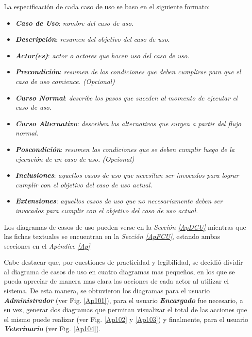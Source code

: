 \documentclass[11pt,oneside]{book}
\begin{document}
La especificación de cada caso de uso se baso en el siguiente formato:
\begin{itemize}
\item \textit{\textbf{Caso de Uso}}: \textit{nombre del caso de uso.}

\item \textit{\textbf{Descripción}}: \textit{resumen del objetivo del caso de uso.}

\item \textit{\textbf{Actor(es)}}: \textit{actor o actores que hacen uso del caso de uso.}

\item \textit{\textbf{Precondición}}: \textit{resumen de las condiciones que deben cumplirse para que el caso de uso comience. (Opcional)}

\item \textit{\textbf{Curso Normal}}: \textit{describe los pasos que suceden al momento de ejecutar el caso de uso.}

\item \textit{\textbf{Curso Alternativo}}: \textit{describen las alternativas que surgen a partir del flujo normal.}

\item \textit{\textbf{Poscondición}}: \textit{resumen las condiciones que se deben cumplir luego de la ejecución de un caso de uso. (Opcional)}

\item \textit{\textbf{Inclusiones}}: \textit{aquellos casos de uso que necesitan ser invocados para lograr cumplir con el objetivo del caso de uso actual.}

\item \textit{\textbf{Extensiones}}: \textit{aquellos casos de uso que no necesariamente deben ser invocados para cumplir con el objetivo del caso de uso actual.}
\end{itemize}

Los diagramas de casos de uso pueden verse en la \textit{Sección \eqref{ApDCU}} mientras que las fichas textuales se encuentran en la \textit{Sección \eqref{ApFCU}}, estando ambas secciones en el \textit{Apéndice \eqref{Ap}} 

Cabe destacar que, por cuestiones de practicidad y legibilidad, se decidió dividir al diagrama de casos de uso en cuatro diagramas mas pequeños, en los que se pueda apreciar de manera mas clara las acciones de cada actor al utilizar el sistema. De esta manera, se obtuvieron los diagramas para el usuario \textit{\textbf{Administrador}} (ver Fig. \eqref{Ap101}), para el usuario \textit{\textbf{Encargado}} fue necesario, a su vez, generar dos diagramas que permitan visualizar el total de las acciones que el mismo puede realizar (ver Fig. \eqref{Ap102} y \eqref{Ap103}) y finalmente, para el usuario \textit{\textbf{Veterinario}} (ver Fig. \eqref{Ap104}).
\end{document}
